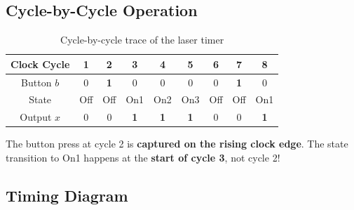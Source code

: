 \documentclass[12pt, a4paper]{article}
\begin{document}
\subsection{Cycle-by-Cycle Operation}

\begin{table}[H]
\centering
\renewcommand{\arraystretch}{1.3}
\begin{tabular}{@{} c *{8}{c} @{}}
  \toprule
  Clock Cycle & 1 & 2 & 3 & 4 & 5 & 6 & 7 & 8 \\
  \midrule
  Button $b$ & 0 & \cellcolor{red!15}\textbf{1} & 0 & 0 & 0 & 0 & \cellcolor{red!15}\textbf{1} & 0 \\
  State & Off & Off & \cellcolor{green!15}On1 & \cellcolor{green!15}On2 & \cellcolor{green!15}On3 & Off & Off & \cellcolor{green!15}On1 \\
  Output $x$ & 0 & 0 & \cellcolor{green!15}\textbf{1} & \cellcolor{green!15}\textbf{1} & \cellcolor{green!15}\textbf{1} & 0 & 0 & \cellcolor{green!15}\textbf{1} \\
  \bottomrule
\end{tabular}
\caption{Cycle-by-cycle trace of the laser timer}
\end{table}

\begin{important}
  The button press at cycle 2 is \textbf{captured on the rising clock edge}. The state transition to On1 happens at the \textbf{start of cycle 3}, not cycle 2!
\end{important}

\subsection{Timing Diagram}
\end{document}
